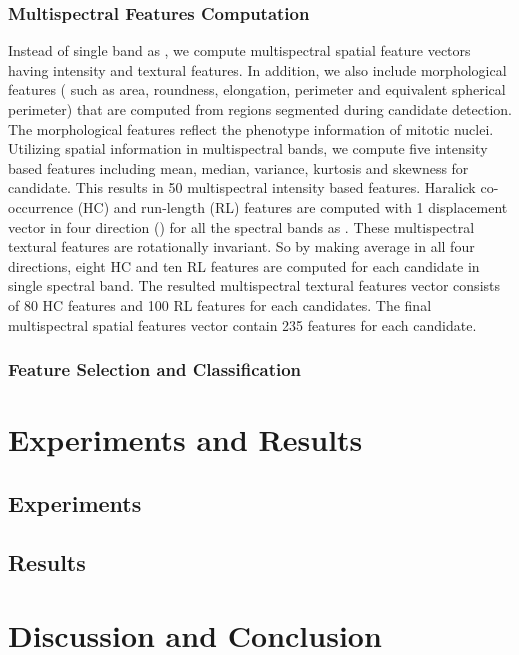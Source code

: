 \documentclass[10pt,twocolumn,letterpaper]{article}
\begin{document}
\subsubsection{Multispectral Features Computation}
Instead of single band as \cite{boucheron2007, masood2009, wu2009, wu2012}, we compute multispectral spatial feature vectors having intensity and textural features. In addition, we also include morphological features ( such as area, roundness, elongation, perimeter and equivalent spherical perimeter) that are computed from regions segmented during candidate detection. The morphological features reflect the phenotype information of mitotic nuclei. Utilizing spatial information in multispectral bands, we compute five intensity based features including mean, median, variance, kurtosis and skewness for candidate. This results in 50 multispectral intensity based features. Haralick co-occurrence (HC) \cite{haralick1973} and run-length (RL) \cite{galloway1975} features are computed with 1 displacement vector in four direction () for all the spectral bands as \cite{irshad2013b}. These multispectral textural features are rotationally invariant. So by making average in all four directions, eight HC and ten RL features are computed for each candidate in single spectral band. The resulted multispectral textural features vector consists of 80 HC features and 100 RL features for each candidates. The final multispectral spatial features vector contain 235 features for each candidate. 

\subsubsection{Feature Selection and Classification}

\section{Experiments and Results}
\label{sec:results}
\subsection{Experiments}

\subsection{Results}

\section{Discussion and Conclusion}
\label{sec:conclusion}
{\small


}
\end{document}

